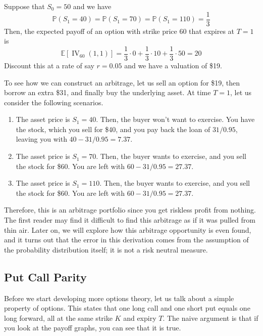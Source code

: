 \documentclass{article}
\DeclareMathOperator{\IV}{IV}
\begin{document}
    \begin{example}
      Suppose that $S_0 = 50$ and we have 
      \begin{equation}
        \mathbb{P}(S_1 = 40) = \mathbb{P}(S_1 = 70) = \mathbb{P}(S_1 = 110) = \frac{1}{3}
      \end{equation}
      Then, the expected payoff of an option with strike price $60$ that expires at $T = 1$ is 
      \begin{equation}
        \mathbb{E}[\IV_{60} (1, 1)] = \frac{1}{3} \cdot 0 + \frac{1}{3} \cdot 10 + \frac{1}{3} \cdot 50 = 20
      \end{equation}
      Discount this at a rate of say $r = 0.05$ and we have a valuation of \$19. 

      To see how we can construct an arbitrage, let us sell an option for \$19, then borrow an extra \$31, and finally buy the underlying asset. At time $T = 1$, let us consider the following scenarios. 
      \begin{enumerate}
        \item The asset price is $S_1 = 40$. Then, the buyer won't want to exercise. You have the stock, which you sell for \$40, and you pay back the loan of $31 /0.95$, leaving you with $40 - 31 / 0.95 = 7.37$.
        \item The asset price is $S_1 = 70$. Then, the buyer wants to exercise, and you sell the stock for \$60. You are left with $60 - 31 / 0.95 = 27.37$. 
        \item The asset price is $S_1 = 110$. Then, the buyer wants to exercise, and you sell the stock for \$60. You are left with $60 - 31 / 0.95 = 27.37$. 
      \end{enumerate}
      Therefore, this is an arbitrage portfolio since you get riskless profit from nothing. The first reader may find it difficult to find this arbitrage as if it was pulled from thin air. Later on, we will explore how this arbitrage opportunity is even found, and it turns out that the error in this derivation comes from the assumption of the probability distribution itself; it is not a risk neutral measure. 
    \end{example}
  
  \subsection{Put Call Parity}
    
    Before we start developing more options theory, let us talk about a simple property of options. This states that one long call and one short put equals one long forward, all at the same strike $K$ and expiry $T$. The naive argument is that if you look at the payoff graphs, you can see that it is true. 
\end{document}

